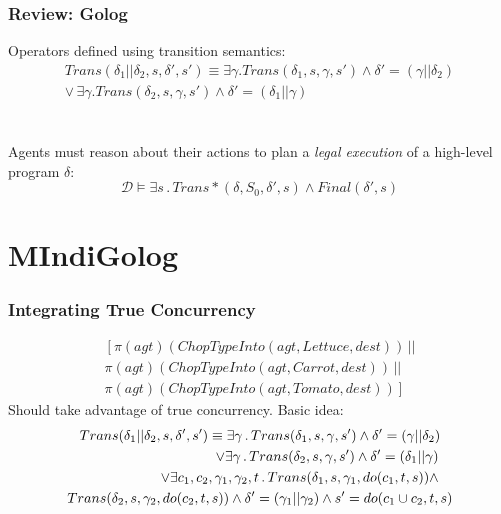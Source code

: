 \documentclass[compress]{beamer}
\begin{document}
\begin{frame}
\frametitle{Review: Golog}
Operators defined using transition semantics:
\begin{multline*}
Trans(\delta_{1}||\delta_{2},s,\delta',s')\equiv\exists\gamma.Trans(\delta_{1},s,\gamma,s')\wedge\delta'=(\gamma||\delta_{2})\\
\vee\,\exists\gamma.Trans(\delta_{2},s,\gamma,s')\wedge\delta'=(\delta_{1}||\gamma)
\end{multline*}
\ \\
\ \\
Agents must reason about their actions to plan a \emph{legal execution} of
a high-level program $\delta$:
\begin{equation*}
\mathcal{D}\models\exists s\,.\,Trans*(\delta,S_0,\delta',s)\wedge Final(\delta',s)
\end{equation*}
\end{frame}

\section{MIndiGolog}

\begin{frame}
\frametitle{Integrating True Concurrency}
\begin{multline*}
\left[\pi(agt)(ChopTypeInto(agt,Lettuce,dest))\,||\right.\\
\pi(agt)(ChopTypeInto(agt,Carrot,dest))\,||\\
\left.\pi(agt)(ChopTypeInto(agt,Tomato,dest))\right]
\end{multline*}
\pause
Should take advantage of true concurrency.  Basic idea:
\begin{multline*}
Trans(\delta_{1}||\delta_{2},s,\delta',s')\equiv\exists\gamma\,.\, Trans(\delta_{1},s,\gamma,s')\wedge\delta'=(\gamma||\delta_{2})\\
\shoveright{\vee\exists\gamma\,.\, Trans(\delta_{2},s,\gamma,s')\wedge\delta'=(\delta_{1}||\gamma)}\\
\shoveright{\vee\exists c_{1},c_{2},\gamma_{1},\gamma_{2},t\,.\, Trans(\delta_{1},s,\gamma_{1},do(c_{1},t,s))\wedge}\\ 
Trans(\delta_{2},s,\gamma_{2},do(c_{2},t,s))\wedge\delta'=(\gamma_{1}||\gamma_{2})\wedge s'=do(c_{1}\cup c_{2},t,s)
\end{multline*}
\end{frame}
\end{document}
